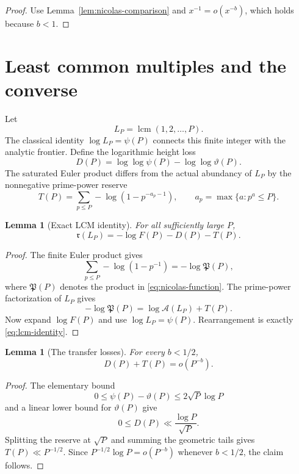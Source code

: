 \documentclass[11pt]{amsart}
\newtheorem{lemma}[theorem]{Lemma}
\theoremstyle{definition}
\theoremstyle{remark}
\numberwithin{equation}{section}
\newcommand{\A}{\mathcal{A}}
\newcommand{\M}{\mathfrak r}
\newcommand{\Pprod}{\mathfrak{P}}
\begin{document}
\begin{proof}
Use Lemma~\ref{lem:nicolas-comparison} and
$x^{-1}=o(x^{-b})$, which holds because $b<1$.
\end{proof}

\section{Least common multiples and the converse}\label{sec:lcm}

Let
\[
  L_P=\operatorname{lcm}(1,2,\dots,P).
\]
The classical identity $\log L_P=\psi(P)$ connects this finite integer with
the analytic frontier.  Define the logarithmic height loss
\begin{equation}\label{eq:height-loss}
  D(P)=\log\log\psi(P)-\log\log\vartheta(P).
\end{equation}
The saturated Euler product differs from the actual abundancy of $L_P$ by
the nonnegative prime-power reserve
\begin{equation}\label{eq:tower-reserve}
  T(P)=\sum_{p\le P}
   -\log\!\left(1-p^{-a_p-1}\right),
  \qquad
  a_p=\max\{a:p^a\le P\}.
\end{equation}

\begin{lemma}[Exact LCM identity]\label{lem:lcm-identity}
For all sufficiently large $P$,
\begin{equation}\label{eq:lcm-identity}
  \M(L_P)=-\log F(P)-D(P)-T(P).
\end{equation}
\end{lemma}

\begin{proof}
The finite Euler product gives
\[
  \sum_{p\le P}-\log(1-p^{-1})
   =-\log \Pprod(P),
\]
where $\Pprod(P)$ denotes the product in \eqref{eq:nicolas-function}.  The
prime-power factorization of $L_P$ gives
\[
  -\log \Pprod(P)=\log\A(L_P)+T(P).
\]
Now expand $\log F(P)$ and use $\log L_P=\psi(P)$.  Rearrangement is exactly
\eqref{eq:lcm-identity}.
\end{proof}

\begin{lemma}[The transfer losses]\label{lem:transfer-loss}
For every $b<1/2$,
\begin{equation}\label{eq:loss-little-o}
  D(P)+T(P)=o(P^{-b}).
\end{equation}
\end{lemma}

\begin{proof}
The elementary bound
\[
  0\le\psi(P)-\vartheta(P)
  \le2\sqrt P\log P
\]
and a linear lower bound for $\vartheta(P)$ give
\[
  0\le D(P)\ll \frac{\log P}{\sqrt P}.
\]
Splitting the reserve at $\sqrt P$ and summing the geometric tails gives
$T(P)\ll P^{-1/2}$.  Since
$P^{-1/2}\log P=o(P^{-b})$ whenever $b<1/2$, the claim follows.
\end{proof}
\end{document}
